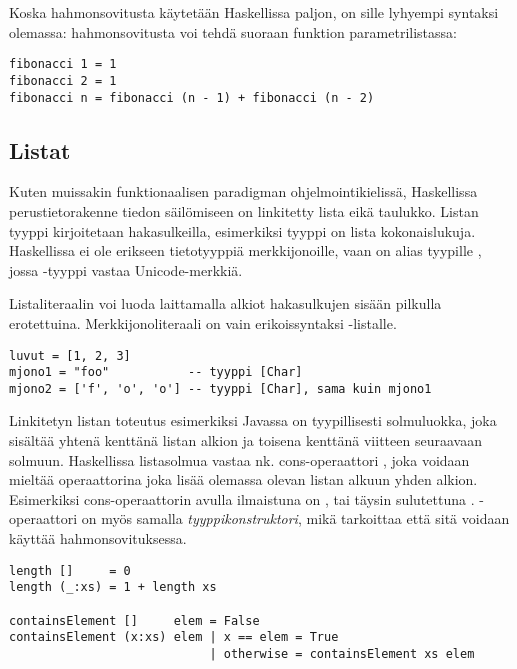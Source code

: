Koska hahmonsovitusta käytetään Haskellissa paljon, on sille lyhyempi syntaksi olemassa:
hahmonsovitusta voi tehdä suoraan funktion parametrilistassa:

\begin{verbatim}
fibonacci 1 = 1
fibonacci 2 = 1
fibonacci n = fibonacci (n - 1) + fibonacci (n - 2)
\end{verbatim}

\subsection{Listat}

Kuten muissakin funktionaalisen paradigman ohjelmointikielissä,
Haskellissa perustietorakenne tiedon säilömiseen on linkitetty lista eikä taulukko.
Listan tyyppi kirjoitetaan hakasulkeilla, esimerkiksi tyyppi \Haskell{[Integer]} on lista kokonaislukuja.
Haskellissa ei ole erikseen tietotyyppiä merkkijonoille,
vaan  on alias tyypille \Haskell{[Char]},
jossa -tyyppi vastaa Unicode-merkkiä.

Listaliteraalin voi luoda laittamalla alkiot hakasulkujen sisään pilkulla erotettuina.
Merkkijonoliteraali on vain erikoissyntaksi -listalle.
\begin{verbatim}
luvut = [1, 2, 3]
mjono1 = "foo"           -- tyyppi [Char]
mjono2 = ['f', 'o', 'o'] -- tyyppi [Char], sama kuin mjono1
\end{verbatim}

Linkitetyn listan toteutus esimerkiksi Javassa on tyypillisesti solmuluokka,
joka sisältää yhtenä kenttänä listan alkion ja toisena kenttänä viitteen seuraavaan solmuun.
Haskellissa listasolmua vastaa nk. cons-operaattori \Haskell{:}, joka voidaan
mieltää operaattorina joka lisää olemassa olevan listan alkuun yhden alkion.
Esimerkiksi \Haskell{[1, 2, 3]} cons-operaattorin avulla ilmaistuna on ,
tai täysin sulutettuna .
\Haskell{:}-operaattori on myös samalla \emph{tyyppikonstruktori},
mikä tarkoittaa että sitä voidaan käyttää hahmonsovituksessa.

\begin{verbatim}
length []     = 0
length (_:xs) = 1 + length xs

containsElement []     elem = False
containsElement (x:xs) elem | x == elem = True
                            | otherwise = containsElement xs elem
\end{verbatim}

